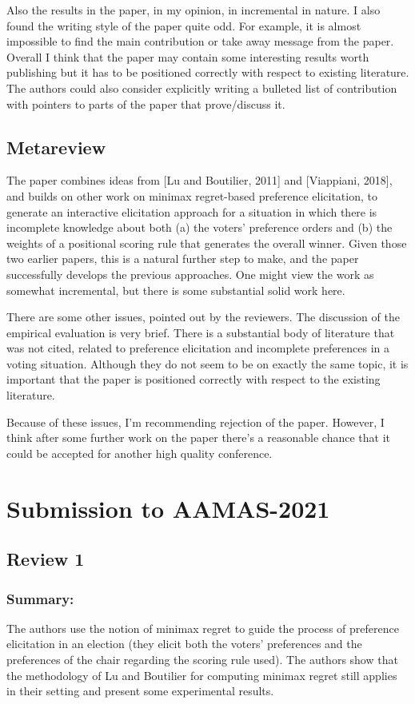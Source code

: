 \documentclass[version=3.21, pagesize, twoside=off, bibliography=totoc, DIV=calc, fontsize=12pt, a4paper]{scrartcl}
\begin{document}
Also the results in the paper, in my opinion, in incremental in nature. I also found the writing style of the paper quite odd. For example, it is almost impossible to find the main contribution or take away message from the paper. Overall I think that the paper may contain some interesting results worth publishing but it has to be positioned correctly with respect to existing literature. The authors could also consider explicitly writing a bulleted list of contribution with pointers to parts of the paper that prove/discuss it.

\subsection{Metareview}
The paper combines ideas from [Lu and Boutilier, 2011] and [Viappiani, 2018], and builds on other work on minimax regret-based preference elicitation, to generate an interactive elicitation approach for a situation in which there is incomplete knowledge about both (a) the voters' preference orders and (b) the weights of a positional scoring rule that generates the overall winner. Given those two earlier papers, this is a natural further step to make, and the paper successfully develops the previous approaches. One might view the work as somewhat incremental, but there is some substantial solid work here.

There are some other issues, pointed out by the reviewers. The discussion of the empirical evaluation is very brief. There is a substantial body of literature that was not cited, related to preference elicitation and incomplete preferences in a voting situation. Although they do not seem to be on exactly the same topic, it is important that the paper is positioned correctly with respect to the existing literature.

Because of these issues, I'm recommending rejection of the paper. However, I think after some further work on the paper there's a reasonable chance that it could be accepted for another high quality conference.

\section{Submission to AAMAS-2021}
\subsection{Review 1}
\subsubsection*{Summary:}	The authors use the notion of minimax regret to guide the process of preference elicitation in an election (they elicit both the voters' preferences and the preferences of the chair regarding the scoring rule used). The authors show that the methodology of Lu and Boutilier for computing minimax regret still applies in their setting and present some experimental results.
\end{document}

